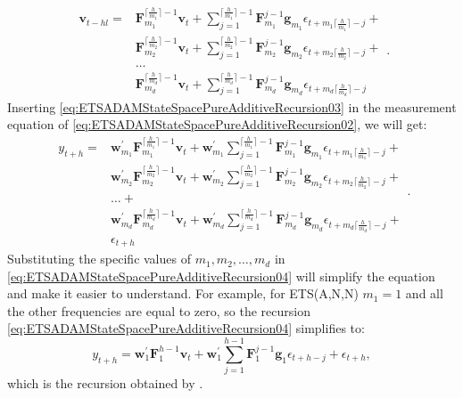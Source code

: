\documentclass[
]{book}
\theoremstyle{definition}
\theoremstyle{definition}
\theoremstyle{definition}
\theoremstyle{definition}
\theoremstyle{remark}
\begin{document}
\begin{equation}
  \begin{aligned}
    \mathbf{v}_{t-h{l}} = & \mathbf{F}_{m_1}^{\lceil\frac{h}{m_1}\rceil-1} \mathbf{v}_{t} + \sum_{j=1}^{\lceil\frac{h}{m_1}\rceil-1} \mathbf{F}_{m_1}^{j-1} \mathbf{g}_{m_1} \epsilon_{t+m_1\lceil\frac{h}{m_1}\rceil-j} + \\
    & \mathbf{F}_{m_2}^{\lceil\frac{h}{m_2}\rceil-1} \mathbf{v}_{t} + \sum_{j=1}^{\lceil\frac{h}{m_2}\rceil-1} \mathbf{F}_{m_2}^{j-1} \mathbf{g}_{m_2} \epsilon_{t+m_2\lceil\frac{h}{m_2}\rceil-j} + \\
    & \dots \\
    & \mathbf{F}_{m_d}^{\lceil\frac{h}{m_d}\rceil-1} \mathbf{v}_{t} + \sum_{j=1}^{\lceil\frac{h}{m_d}\rceil-1} \mathbf{F}_{m_d}^{j-1} \mathbf{g}_{m_d} \epsilon_{t+m_d\lceil\frac{h}{m_d}\rceil-j}
  \end{aligned}.
  \label{eq:ETSADAMStateSpacePureAdditiveRecursion03}
\end{equation}
Inserting \eqref{eq:ETSADAMStateSpacePureAdditiveRecursion03} in the measurement equation of \eqref{eq:ETSADAMStateSpacePureAdditiveRecursion02}, we will get:
\begin{equation}
  \begin{aligned}
    y_{t+h} = & \mathbf{w}_{m_1}^\prime \mathbf{F}_{m_1}^{\lceil\frac{h}{m_1}\rceil-1} \mathbf{v}_{t} + \mathbf{w}_{m_1}^\prime \sum_{j=1}^{\lceil\frac{h}{m_1}\rceil-1} \mathbf{F}_{m_1}^{j-1} \mathbf{g}_{m_1} \epsilon_{t+m_1\lceil\frac{h}{m_1}\rceil-j} + \\
    & \mathbf{w}_{m_2}^\prime \mathbf{F}_{m_2}^{\lceil\frac{h}{m_2}\rceil-1} \mathbf{v}_{t} + \mathbf{w}_{m_2}^\prime \sum_{j=1}^{\lceil\frac{h}{m_2}\rceil-1} \mathbf{F}_{m_2}^{j-1} \mathbf{g}_{m_2} \epsilon_{t+m_2\lceil\frac{h}{m_2}\rceil-j} + \\
    & \dots + \\
    & \mathbf{w}_{m_d}^\prime \mathbf{F}_{m_d}^{\lceil\frac{h}{m_d}\rceil-1} \mathbf{v}_{t} + \mathbf{w}_{m_d}^\prime \sum_{j=1}^{\lceil\frac{h}{m_d}\rceil-1} \mathbf{F}_{m_d}^{j-1} \mathbf{g}_{m_d} \epsilon_{t+m_d\lceil\frac{h}{m_d}\rceil-j} + \\
    & \epsilon_{t+h}
  \end{aligned}.
  \label{eq:ETSADAMStateSpacePureAdditiveRecursion04}
\end{equation}
Substituting the specific values of \(m_1, m_2, \dots, m_d\) in \eqref{eq:ETSADAMStateSpacePureAdditiveRecursion04} will simplify the equation and make it easier to understand. For example, for ETS(A,N,N) \(m_1=1\) and all the other frequencies are equal to zero, so the recursion \eqref{eq:ETSADAMStateSpacePureAdditiveRecursion04} simplifies to:
\begin{equation}
    y_{t+h} = \mathbf{w}_{1}^\prime \mathbf{F}_{1}^{h-1} \mathbf{v}_{t} + \mathbf{w}_{1}^\prime \sum_{j=1}^{h-1} \mathbf{F}_{1}^{j-1} \mathbf{g}_{1} \epsilon_{t+h-j} + \epsilon_{t+h} ,
  \label{eq:ETSADAMStateSpacePureAdditiveRecursion05}
\end{equation}
which is the recursion obtained by \citet{Hyndman2008b}.
\end{document}
